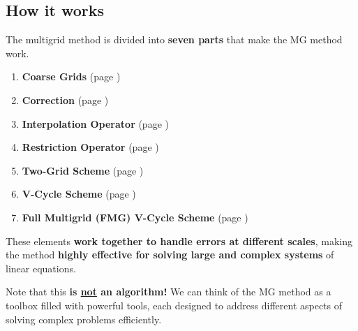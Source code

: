 \subsection{How it works}

The multigrid method is divided into \textbf{seven parts} that make the MG method work.
\begin{enumerate}
    \item \textbf{Coarse Grids} (page \pageref{subsubsection: Coarse Grids})
    \item \textbf{Correction} (page \pageref{subsubsection: Correction})
    \item \textbf{Interpolation Operator} (page \pageref{subsubsection: Interpolation Operator})
    \item \textbf{Restriction Operator} (page \pageref{subsubsection: Restriction Operator})
    \item \textbf{Two-Grid Scheme} (page \pageref{subsubsection: Two-Grid Scheme})
    \item \textbf{V-Cycle Scheme} (page \pageref{subsubsection: V-Cycle Scheme})
    \item \textbf{Full Multigrid (FMG) V-Cycle Scheme} (page \pageref{subsubsection: Full Multigrid (FMG) V-Cycle Scheme})
\end{enumerate}

\noindent
These elements \textbf{work together to handle errors at different scales}, making the method \textbf{highly effective for solving large and complex systems} of linear equations.

\highspace
Note that this \textbf{is \underline{not} an algorithm!} We can think of the MG method as a toolbox filled with powerful tools, each designed to address different aspects of solving complex problems efficiently.